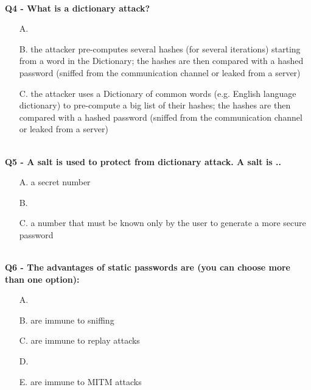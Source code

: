 \textbf{\\Q4 - What is a dictionary attack?}
\begin{enumerate}
    \item[A.] 
    \item[B.] the attacker pre-computes several hashes (for several iterations) starting from a word in the Dictionary; the hashes are then compared with a hashed password (sniffed from the communication channel or leaked from a server)
    \item[C.] the attacker uses a Dictionary of common words (e.g. English language dictionary) to pre-compute a big list of their hashes; the hashes are then compared with a hashed password (sniffed from the communication channel or leaked from a server)
\end{enumerate}

\textbf{\\Q5 - A salt is used to protect from dictionary attack. A salt is ..}
\begin{enumerate}
    \item[A.] a secret number
    \item[B.] 
    \item[C.] a number that must be known only by the user to generate a more secure password
\end{enumerate}

\textbf{\\Q6 - The advantages of static passwords are (you can choose more than one option):}
\begin{enumerate}
    \item[A.] 
    \item[B.] are immune to sniffing
    \item[C.] are immune to replay attacks
    \item[D.] 
    \item[E.] are immune to MITM attacks
\end{enumerate}


